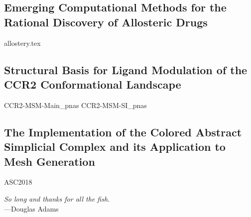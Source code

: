 \documentclass[11pt, oneside, chapterheads, final]{ucsd}
\theoremstyle{definition}
\renewcommand{\bibitemsep}{\baselineskip}
\newcommand{\pchapbib}{%
\clearpage%
\begingroup%
\setstretch{1.0}%
\printbibliography[segment=\therefsegment,heading=subbibintoc]{}%
\endgroup}
\begin{document}
\newpage
\begin{refsection}
\chapter{Emerging Computational Methods for the Rational Discovery of Allosteric Drugs}\label{chap:allostery}
{allostery.tex}
\pchapbib
\end{refsection}

\newpage
\begin{refsection}
\chapter{Structural Basis for Ligand Modulation of the CCR2 Conformational Landscape}\label{chap:ccr2}
{CCR2-MSM-Main_pnas}
{CCR2-MSM-SI_pnas}
\pchapbib
\end{refsection}

\newpage
\begin{refsection}
\chapter{The Implementation of the Colored Abstract Simplicial Complex and its Application to Mesh Generation}\label{chap:asc}
{ASC2018}
\pchapbib
\end{refsection}

\newpage
\vspace*{3in}\hfill\begin{center}
\emph{So long and thanks for all the fish.}\\
---Douglas Adams
\end{center}


% 
\end{document}
